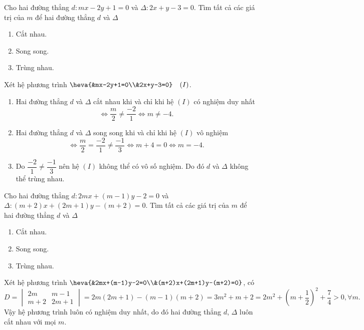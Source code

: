 	\begin{bt}%
		Cho hai đường thẳng $d\colon mx-2y+1=0$ và $\Delta\colon 2x+y-3=0$. Tìm tất cả các giá trị của $m$ để hai đường thẳng $d$ và $\Delta$
		\begin{enumerate}
			\item Cắt nhau.		
			\item Song song.	
			\item Trùng nhau.		
		\end{enumerate}
		\loigiai
		{Xét hệ phương trình $\heva{&mx-2y+1=0\\&2x+y-3=0} \quad (I)$.
			\begin{enumerate}
				\item Hai đường thẳng $d$ và $\Delta$ cắt nhau khi và chỉ khi hệ $(I)$ có nghiệm duy nhất $$\Leftrightarrow \dfrac{m}{2}\ne \dfrac{-2}{1} \Leftrightarrow m\neq -4.$$
				\item Hai đường thẳng $d$ và $\Delta$ song song khi và chỉ khi hệ $(I)$ vô nghiệm
				$$\Leftrightarrow \dfrac{m}{2}=\dfrac{-2}{1}\ne \dfrac{-1}{3} \Leftrightarrow m+4=0 \Leftrightarrow m=-4.$$
				\item Do $\dfrac{-2}{1}\ne \dfrac{-1}{3}$ nên hệ $(I)$ không thể có vô số nghiệm. Do đó $d$ và $\Delta$ không thể trùng nhau.
		\end{enumerate}}
	\end{bt}
	
	\begin{bt}%
		Cho hai đường thẳng $d\colon 2mx+(m-1)y-2=0$ và $\Delta\colon (m+2)x+(2m+1)y-(m+2)=0$. Tìm tất cả các giá trị của $m$ để hai đường thẳng $d$ và $\Delta$
		\begin{enumerate}
			\item Cắt nhau.		
			\item Song song.	
			\item Trùng nhau.		
		\end{enumerate}
		\loigiai
		{Xét hệ phương trình $\heva{&2mx+(m-1)y-2=0\\&(m+2)x+(2m+1)y-(m+2)=0}$, có
			$$D=\begin{vmatrix}
				2m&m-1\\m+2&2m+1
			\end{vmatrix}= 2m(2m+1)-(m-1)(m+2)=3m^2+m+2 = 2m^2+\left(m+\dfrac{1}{2}\right)^2+\dfrac{7}{4}>0, \forall m.$$
			Vậy hệ phương trình luôn có nghiệm duy nhất, do đó hai đường thẳng $d$, $\Delta$ luôn cắt nhau với mọi $m$.}
	\end{bt}
	
